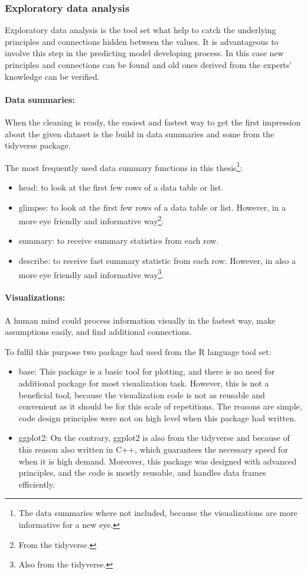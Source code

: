 	\subsubsection{Exploratory data analysis}
		Exploratory data analysis is the tool set what help to catch the underlying principles and connections hidden between the values. It is advantageous to involve this step in the predicting model developing process. In this case new principles and connections can be found and old ones derived from the experts' knowledge can be verified.
		\paragraph{Data summaries:}
		When the cleaning is ready, the easiest and fastest way to get the first impression about the given dataset is the build in data summaries and some from the tidyverse package.

		The most frequently used data summary functions in this thesis\footnote{The data summaries where not included, because the visualizations are more informative for a new eye.}:
		\begin{itemize}
			\item{head:} to look at the first few rows of a data table or list.
			\item{glimpse:} to look at the first few rows of a data table or list. However, in a more eye friendly and informative way\footnote{From the tidyverse.}.
			\item{summary:} to receive summary statistics from each row.
			\item{describe:} to receive fast summary statistic from each row. However, in also a more eye friendly and informative way\footnote{Also from the tidyverse.}.
		\end{itemize}
		\paragraph{Visualizations:}
		A human mind could process information visually in the fastest way, make assumptions easily, and find additional connections. 

		To fulfil this purpose two package had used from the R language tool set:
		\begin{itemize}
			\item{base:} This package is a basic tool for plotting, and there is no need for additional package for most visualization task. However, this is not a beneficial tool, because the visualization code is not as reusable and convenient as it should be for this scale of repetitions. The reasons are simple, code design principles were not on high level when this package had written.
			\item{ggplot2:} On the contrary, ggplot2 is also from the tidyverse and because of this reason also written in C++, which guarantees the necessary speed for when it is high demand. Moreover, this package was designed with advanced principles, and the code is mostly reusable, and handles data frames efficiently. 
		\end{itemize} 


